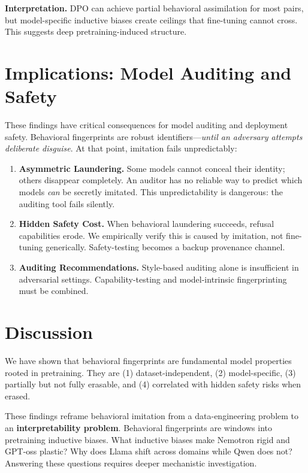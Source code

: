 \documentclass[11pt]{article}
\begin{document}
\textbf{Interpretation.} DPO can achieve partial behavioral assimilation for most pairs, but model-specific inductive biases create ceilings that fine-tuning cannot cross. This suggests deep pretraining-induced structure.

\section{Implications: Model Auditing and Safety}

These findings have critical consequences for model auditing and deployment safety. Behavioral fingerprints are robust identifiers---\textit{until an adversary attempts deliberate disguise}. At that point, imitation fails unpredictably:

\begin{enumerate}
  \item \textbf{Asymmetric Laundering.} Some models cannot conceal their identity; others disappear completely. An auditor has no reliable way to predict which models \textit{can} be secretly imitated. This unpredictability is dangerous: the auditing tool fails silently.

  \item \textbf{Hidden Safety Cost.} When behavioral laundering succeeds, refusal capabilities erode. We empirically verify this is caused by imitation, not fine-tuning generically. Safety-testing becomes a backup provenance channel.

  \item \textbf{Auditing Recommendations.} Style-based auditing alone is insufficient in adversarial settings. Capability-testing and model-intrinsic fingerprinting must be combined.
\end{enumerate}

\section{Discussion}

We have shown that behavioral fingerprints are fundamental model properties rooted in pretraining. They are (1) dataset-independent, (2) model-specific, (3) partially but not fully erasable, and (4) correlated with hidden safety risks when erased.

These findings reframe behavioral imitation from a data-engineering problem to an \textbf{interpretability problem}. Behavioral fingerprints are windows into pretraining inductive biases. What inductive biases make Nemotron rigid and GPT-oss plastic? Why does Llama shift across domains while Qwen does not? Answering these questions requires deeper mechanistic investigation.
\end{document}
